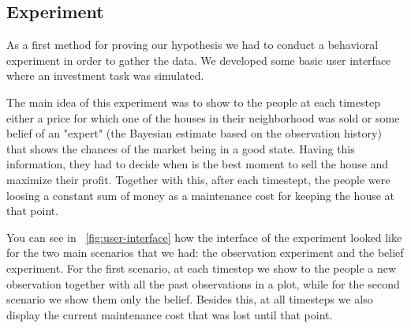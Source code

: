 \subsection{Experiment}

As a first method for proving our hypothesis we had to conduct a behavioral experiment in order to gather the data. We developed some basic user interface where an investment task was simulated.

The main idea of this experiment was to show to the people at each timestep either a price for which one of the houses in their neighborhood was sold or some belief of an "expert" (the Bayesian estimate based on the observation history) that shows the chances of the market being in a good state. Having this information, they had to decide when is the best moment to sell the house and maximize their profit. Together with this, after each timestept, the people were loosing a constant sum of money as a maintenance cost for keeping the house at that point.

You can see in ~\autoref{fig:user-interface} how the interface of the experiment looked like for the two main scenarios that we had: the observation experiment and the belief experiment. For the first scenario, at each timestep we show to the people a new observation together with all the past observations in  a plot, while for the second scenario we show them only the belief. Besides this, at all timesteps we also display the current maintenance cost that was lost until that point. 

